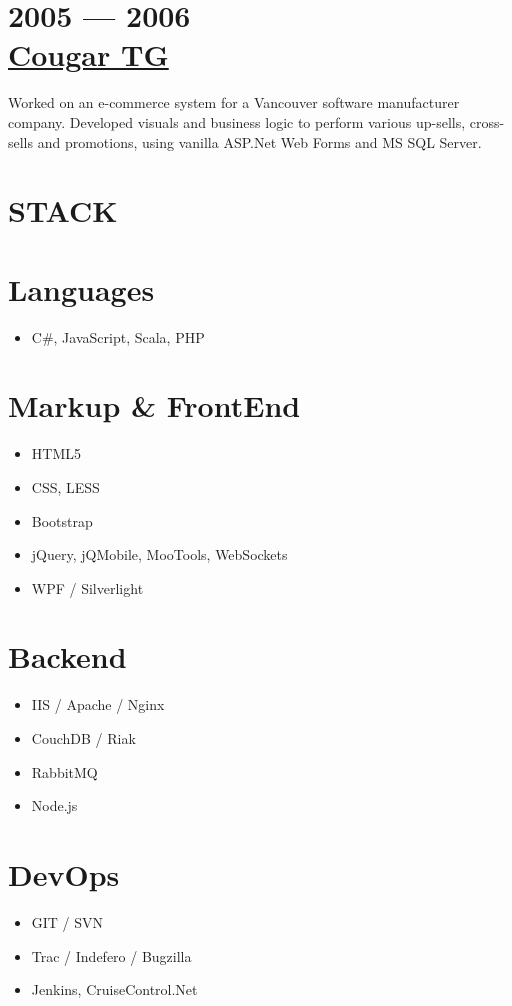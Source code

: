 \documentclass[margin]{res}
\begin{document}
\begin{resume}
	\section{2005 --- 2006\\\href{http://cougartg.com}{Cougar TG}}
	Worked on an e-commerce system for a Vancouver software manufacturer company. Developed visuals and business logic to perform various up-sells, cross-sells and promotions, using vanilla ASP.Net Web Forms and MS SQL Server.

\section{STACK} 
	\normalsize{\section{Languages}}
		\itemsep -2pt
 		\begin{itemize}
 			\item C\#, JavaScript, Scala, PHP
		\end{itemize}
	\normalsize{\section{Markup \& FrontEnd}}
		\itemsep -2pt
		\begin{itemize}
			\item HTML5
			\item CSS, LESS
			\item Bootstrap
			\item jQuery, jQMobile, MooTools, WebSockets
			\item WPF / Silverlight
		\end{itemize}
	\normalsize{\section{Backend}}
		\begin{itemize}
			\item IIS / Apache / Nginx
			\item CouchDB / Riak
			\item RabbitMQ
			\item Node.js
		\end{itemize}
	\normalsize{\section{DevOps}}
		\begin{itemize}
			\item GIT / SVN
			\item Trac / Indefero / Bugzilla
			\item Jenkins, CruiseControl.Net
		\end{itemize}
\newpage

\end{resume}
\end{document}
